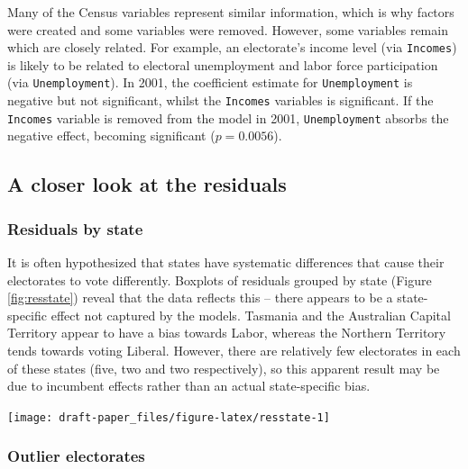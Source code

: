 \documentclass[11pt,a4paper,]{article}
\let\origfigure\figure
\let\endorigfigure\endfigure
\renewenvironment{figure}[1][2] {
    \expandafter\origfigure\expandafter[htbp]
} {
    \endorigfigure
}
\begin{document}
Many of the Census variables represent similar information, which is why factors were created and some variables were removed. However, some variables remain which are closely related. For example, an electorate's income level (via \texttt{Incomes}) is likely to be related to electoral unemployment and labor force participation (via \texttt{Unemployment}). In 2001, the coefficient estimate for \texttt{Unemployment} is negative but not significant, whilst the \texttt{Incomes} variables is significant. If the \texttt{Incomes} variable is removed from the model in 2001, \texttt{Unemployment} absorbs the negative effect, becoming significant (\(p = 0.0056\)).

\hypertarget{a-closer-look-at-the-residuals}{%
\subsection{A closer look at the residuals}\label{a-closer-look-at-the-residuals}}

\hypertarget{residuals-by-state}{%
\subsubsection{Residuals by state}\label{residuals-by-state}}

It is often hypothesized that states have systematic differences that cause their electorates to vote differently. Boxplots of residuals grouped by state (Figure \ref{fig:resstate}) reveal that the data reflects this -- there appears to be a state-specific effect not captured by the models. Tasmania and the Australian Capital Territory appear to have a bias towards Labor, whereas the Northern Territory tends towards voting Liberal. However, there are relatively few electorates in each of these states (five, two and two respectively), so this apparent result may be due to incumbent effects rather than an actual state-specific bias.

\begin{figure}[h]

{\centering \texttt{[image: draft-paper\_files/figure-latex/resstate-1]} 

}

\caption{Boxplot of residuals by state with jittered points. States ordered by median residual. A state-specific bias not captured by the model is evident.}\label{fig:resstate}
\end{figure}

\hypertarget{outlier-electorates}{%
\subsubsection{Outlier electorates}\label{outlier-electorates}}
\end{document}
